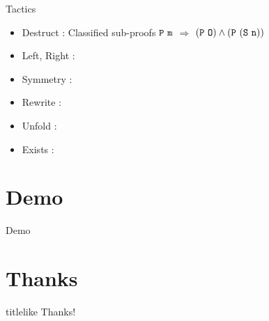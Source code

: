 \documentclass[UTF-8]{beamer}
\begin{document}
\begin{frame}{Tactics}
\begin{itemize}
\item Destruct : Classified sub-proofs \quad $\tt P\ m$ $\Rightarrow$ $\tt (P\ O)\wedge(P\ (S\ n))$
\item Left, Right :
\item Symmetry :
\item Rewrite :
\item Unfold :
\item Exists :
\end{itemize}
\end{frame}

\section{Demo}
\begin{frame}{Demo}
\end{frame}

\section*{Thanks}
\begin{frame}
\LARGE
\begin{beamercolorbox}[center,ht=3em]{titlelike}
\vspace{1em}
Thanks!
\end{beamercolorbox}
\end{frame}
\end{document}

